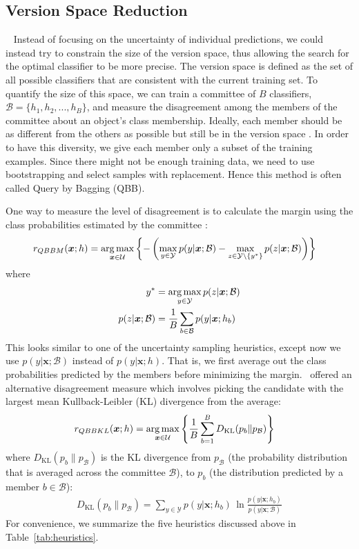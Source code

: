 \documentclass[fleqn,10pt,lineno]{wlpeerj} %
\newcommand{\B}{\mathcal{B}}
\newcommand{\Y}{\mathcal{Y}}
\newcommand{\Unlabeled}{\mathcal{U}}
\newcommand*{\argmax}{\operatornamewithlimits{arg\,max}\limits}
\begin{document}
\subsection{Version Space Reduction}~\label{subsec:version}
Instead of focusing on the uncertainty of individual predictions, we could
instead try to constrain the size of the version space, thus allowing the
search for the optimal classifier to be more precise. The version space is
defined as the set of all possible classifiers that are consistent with the
current training set. To quantify the size of this space, we can train a
committee of $B$ classifiers, $\B = \{h_1, h_2, ..., h_B\}$, and measure the
disagreement among the members of the committee about an object's class
membership. Ideally, each member should be as different from the others as
possible but still be in the version space \citep{melville04}. In order to have
this diversity, we give each member only a subset of the training examples.
Since there might not be enough training data, we need to use bootstrapping and
select samples with replacement. Hence this method is often called Query by
Bagging (QBB).

One way to measure the level of disagreement is to calculate the margin using
the class probabilities estimated by the committee \citep{melville04}:
\begin{align}
	r_{QBBM}(\bm{x}; h) &= \argmax_{\bm{x} \in \Unlabeled}
	\left\{ - \left( \max_{y \in \Y} p(y | \bm{x}; \B) -
	\max_{z \in \Y \setminus \{y^*\}} p(z | \bm{x}; \B) \right) \right\}
\end{align}
where
\begin{align}
	y^* &= \argmax_{y \in \Y} p(z | \bm{x}; \B) \\
	p(z | \bm{x}; \B) &= \dfrac{1}{B} \sum_{b \in \B} p(y | \bm{x}; h_b)
\end{align}
This looks similar to one of the uncertainty sampling heuristics, except now we
use $p(y | \bm{x}; \B)$ instead of $ p(y | \bm{x}; h)$. That is, we first
average out the class probabilities predicted by the members before minimizing
the margin.~\cite{mccallum98} offered an alternative disagreement measure which
involves picking the candidate with the largest mean Kullback-Leibler (KL)
divergence from the average:
\begin{align}
	r_{QBBKL}(\bm{x}; h) &= \argmax_{\bm{x} \in \Unlabeled}
	\left\{ \dfrac{1}{B}
	\sum_{b=1}^B D_{\mathrm{KL}}(p_b\|p_\B) \right\}
\end{align}
where $D_{\mathrm{KL}}(p_b\|p_\B)$ is the KL divergence from $p_\B$ (the
probability distribution that is averaged across the committee $\B$), to $p_b$
(the distribution predicted by a member $b \in \B$):
\begin{align}
	D_{\mathrm{KL}}(p_b\|p_\B) = \sum_{y \in \Y} p(y | \bm{x}; h_b) \,
								 \ln\frac{p(y | \bm{x}; h_b)}{p(y | \bm{x}; \B)}
\end{align}
For convenience, we summarize the five heuristics discussed above in
Table~\ref{tab:heuristics}.
\end{document}
